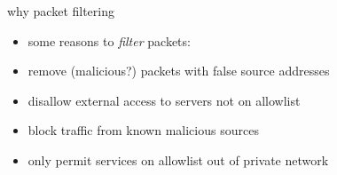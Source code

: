 \begin{frame}[label=pktFilterExamples]{why packet filtering}
    \begin{itemize}
    \item some reasons to \textit{filter} packets:
    \vspace{.5cm}
    \item remove (malicious?) packets with false source addresses
    \item disallow external access to servers not on allowlist
    \item block traffic from known malicious sources
    \item only permit services on allowlist out of private network
    \end{itemize}
\end{frame}

